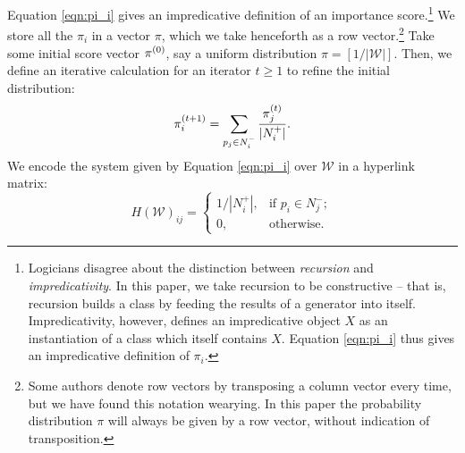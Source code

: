 \documentclass[../exploring-pagerank.tex]{subfiles}
\begin{document}
    Equation \eqref{eqn:pi_i} gives an impredicative definition of an importance score.\footnote{Logicians disagree about the distinction between \textit{recursion} and \textit{impredicativity}. In this paper, we take recursion to be constructive -- that is, recursion builds a class by feeding the results of a generator into itself. Impredicativity, however, defines an impredicative object $X$ as an instantiation of a class which itself contains $X$. Equation \eqref{eqn:pi_i} thus gives an impredicative definition of $\pi_i$.} We store all the $\pi_i$ in a vector $\pi$, which we take henceforth as a row vector.\footnote{Some authors denote row vectors by transposing a column vector every time, but we have found this notation wearying. In this paper the probability distribution $\pi$ will always be given by a row vector, without indication of transposition.} Take some initial score vector $\pi^{(0)}$, say a uniform distribution $\pi = [1/|\mathcal{W}|]$. Then, we define an iterative calculation for an iterator $t\geq 1$ to refine the initial distribution:
 	 \begin{equation}
 	    \label{eqn:pi_t}
	 	\pi^{(t+1)}_i = \sum_{p_j\in N^-_i}{\frac{\pi^{(t)}_j}{|N^+_i|}}.
 	\end{equation}
 	We encode the system given by Equation \eqref{eqn:pi_i} over $\mathcal{W}$ in a hyperlink matrix:
 	\begin{equation*}
 		H(\mathcal{W})_{ij}=\begin{cases}
 			1/|N^+_i|, & \text{if } p_i \in N^-_j; \\
 			0, & \text{otherwise}.
 		\end{cases}
 	\end{equation*}
 	
\end{document}
